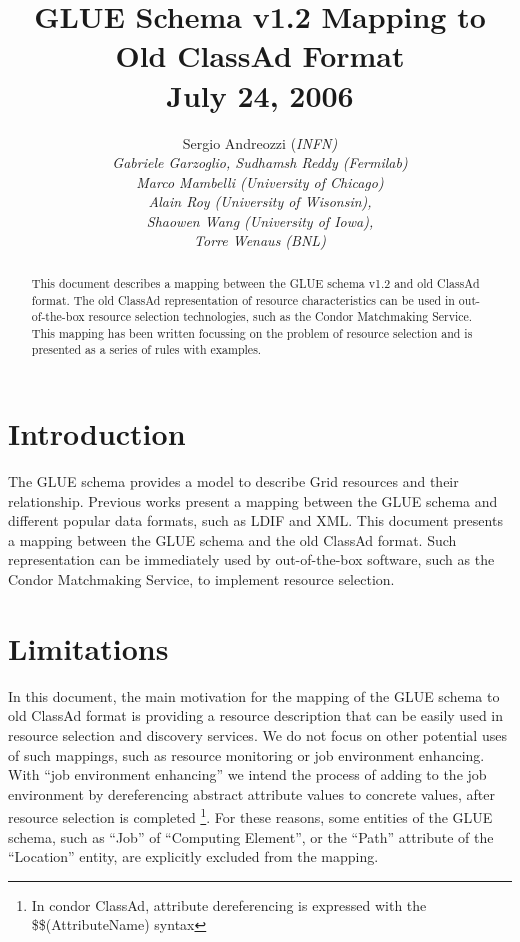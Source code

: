 \documentclass[12pt]{article}
\begin{document}
\title{GLUE Schema v1.2 Mapping to Old ClassAd Format\\
July 24, 2006}
\author{
Sergio Andreozzi (\em{INFN})\\
Gabriele Garzoglio, Sudhamsh Reddy (\em{Fermilab})\\
Marco Mambelli (\em{University of Chicago})\\
Alain Roy (\em{University of Wisonsin}),\\
Shaowen Wang (\em{University of Iowa}),\\
Torre Wenaus (\em{BNL})}

\maketitle

\begin{abstract}
\noindent This document describes a mapping between the GLUE schema
v1.2 and old ClassAd format. The old ClassAd representation of
resource characteristics can be used in out-of-the-box resource
selection technologies, such as the Condor Matchmaking Service. This
mapping has been written focussing on the problem of resource
selection and is presented as a series of rules with examples.
\end{abstract}

\newpage

\tableofcontents

\newpage

\section{Introduction}
\label{se:Introduction}

The GLUE schema \cite{GLUE-schema} provides a model to describe Grid
resources and their relationship. Previous works \cite{LDIF-mapping}
\cite{XML-mapping} present a mapping between the GLUE schema and
different popular data formats, such as LDIF and XML. This document
presents a mapping between the GLUE schema and the old ClassAd
format. Such representation can be immediately used by
out-of-the-box software, such as the Condor Matchmaking Service, to
implement resource selection.

\section{Limitations}
\label{se:limitation}

In this document, the main motivation for the mapping of the GLUE
schema to old ClassAd format is providing a resource description
that can be easily used in resource selection and discovery
services. We do not focus on other potential uses of such mappings,
such as resource monitoring or job environment enhancing. With ``job
environment enhancing'' we intend the process of adding to the job
environment by dereferencing abstract attribute values to concrete
values, after resource selection is completed \footnote{In condor
ClassAd, attribute dereferencing is expressed with the
\$\$(AttributeName) syntax}. For these reasons, some entities of the
GLUE schema, such as ``Job'' of ``Computing Element'', or
the ``Path'' attribute of the ``Location'' entity, are explicitly
excluded from the mapping.
\end{document}
